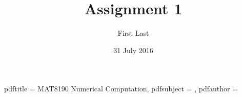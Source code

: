 \newcommand{\usqcoursecode}{MAT8190}
\newcommand{\usqcoursedescription}{Numerical Computation}
\title{Assignment 1}
\author{First Last}
\newcommand{\usqstudentnumber}{123456789}
\newcommand{\usqstudentemail}{a@b.c}
\newcommand{\usqacademicyear}{2016}
\newcommand{\usqacademicsemester}{2}
\date{31 July 2016}
\newcommand{\usqpreparedfor}{Dr A B}
\newcommand{\usqpreparedforposition}{Senior Lecturer (Mathematics and Computing)}
\newcommand{\usqpreparedfororganisation}{School of Agricultural, Computational and Environmental}
\makeatletter
\hypersetup
{
  pdftitle   =  \usqcoursecode{} \usqcoursedescription,
  pdfsubject = \@title,
  pdfauthor  = \@author
}
\makeatother